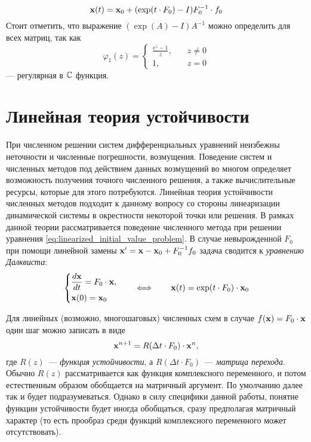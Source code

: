 \begin{equation}
    \label{eq:linearized_solution}
    \mathbf{x}(t) = \mathbf{x}_0 + (\exp(t \cdot F_0) - I) F_0^{-1} \cdot f_0
\end{equation}
Стоит отметить, что выражение $ (\exp(A) - I) A^{-1} $ можно определить для всех матриц, так как
\begin{equation}
    \label{eq:phi_1_function}
    \varphi_1(z) =
    \begin{cases}
        \frac{e^z - 1}{z}, &\quad z \neq 0 \\
        1, &\quad z = 0
    \end{cases}
\end{equation}
--- регулярная в $ \mathbb{C} $ функция.



\section{Линейная теория устойчивости}
\label{sec:linear_stability}

При численном решении систем дифференциальных уравнений неизбежны неточности и численные погрешности, возмущения.
Поведение систем и численных методов под действием данных возмущений во многом определяет возможность получения точного численного решения,
а также вычислительные ресурсы, которые для этого потребуются.
Линейная теория устойчивости численных методов подходит к данному вопросу со стороны линеаризации динамической системы в окрестности некоторой точки или решения.
В рамках данной теории рассматривается поведение численного метода при решении уравнения \eqref{eq:linearized_initial_value_problem}.
В случае невырожденной $ F_0 $ при помощи линейной замены $ \mathbf{x}' = \mathbf{x} - \mathbf{x}_0 + F_0^{-1} f_0 $ задача сводится к \emph{уравнению Далквиста}:
%
\begin{equation}
    \label{eq:Dahlquist_equation}
    \begin{dcases}
        \dfrac{d \mathbf{x}}{d t} = F_0 \cdot \mathbf{x}, \\
        \mathbf{x}(0) = \mathbf{x}_0
    \end{dcases}
    \qquad
    \Longleftrightarrow
    \qquad
    \mathbf{x}(t) = \exp(t \cdot F_0) \cdot \mathbf{x}_0
\end{equation}

Для линейных (возможно, многошаговых) численных схем в случае $ f(\mathbf{x}) = F_0 \cdot \mathbf{x} $ один шаг можно записать в виде
%
\begin{equation}
    \label{eq:stability_function}
    \mathbf{x}^{n+1} = R(\Delta t \cdot F_0) \cdot \mathbf{x}^n,
\end{equation}
%
где $ R(z) $~--- \emph{функция устойчивости}, а $ R(\Delta t \cdot F_0) $~--- \emph{матрица перехода}.
Обычно $ R(z) $ рассматривается как функция комплексного переменного, и потом естественным образом обобщается на матричный аргумент.
По умолчанию далее так и будет подразумеваться.
Однако в силу специфики данной работы, понятие функции устойчивости будет иногда обобщаться, сразу предполагая матричный характер
(то есть прообраз среди функций комплексного переменного может отсутствовать).

